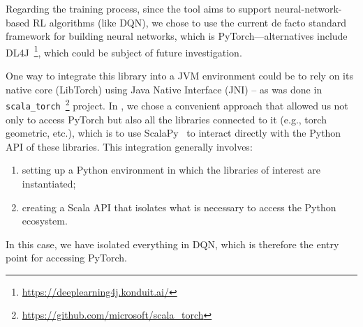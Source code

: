 Regarding the training process,
 since the tool aims to support neural-network-based RL algorithms (like DQN),
 we chose to use the current de facto standard framework 
 for building neural networks, which is PyTorch---alternatives include DL4J~\footnote{\url{https://deeplearning4j.konduit.ai/}}, which could be subject of future investigation.
 
%
One way to integrate this library into a JVM environment could be 
 to rely on its native core (LibTorch) using Java Native Interface (JNI) -- 
 as was done in \texttt{scala\_torch}~\footnote{\url{https://github.com/microsoft/scala_torch}} project. 
 In \scarlib{}, we chose a convenient approach 
 that allowed us not only to access PyTorch 
 but also all the libraries connected to it 
 (e.g., torch geometric, etc.), 
 which is to use ScalaPy~\cite{Laddad2020}  to interact directly with the Python API 
 of these libraries.
%
This integration generally involves:
\begin{enumerate}
    \item setting up a Python environment in which the libraries of interest are instantiated;
    \item creating a Scala API that isolates what is necessary to access the Python ecosystem.
\end{enumerate}
In this case, we have isolated everything in DQN, 
 which is therefore the entry point for accessing PyTorch.
